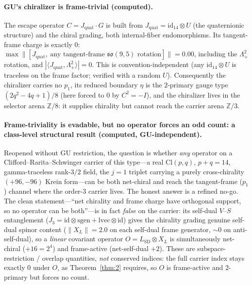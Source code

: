 \documentclass[11pt]{article}
\theoremstyle{definition}
\theoremstyle{remark}
\newcommand{\Z}{\mathbb{Z}}
\newcommand{\Cl}{\mathrm{Cl}}
\newcommand{\id}{\mathrm{id}}
\newcommand{\Lamp}{\Lambda^2_{+}}
\newcommand{\Jq}{J_{\mathrm{quat}}}
\begin{document}
\paragraph{GU's chiralizer is frame-trivial (computed).} The escape operator $C=\Jq\cdot G$ is built from
$\Jq = \id_{14}\otimes U$ (the quaternionic structure) and the chiral grading, both internal-fiber
endomorphisms. Its tangent-frame charge is exactly $0$:
$\max\|[\Jq,\ \text{any tangent-frame }\mathfrak{so}(9,5)\text{ rotation}]\| = 0.00$, including the $\Lamp$
rotation, and $|\langle \Jq,\Lamp\rangle| = 0$. This is convention-independent (any $\id_{14}\otimes U$ is
traceless on the frame factor; verified with a random $U$). Consequently the chiralizer carries no $p_1$, its
reduced boundary $\eta$ is the $2$-primary gauge type $(2q^2-4q+1)/8$ (here forced to $0$ by $C^2=-I$), and the
chiralizer lives in the selector arena $\Z/8$: it supplies chirality but cannot reach the carrier arena $\Z/3$.

\paragraph{Frame-triviality is evadable, but no operator forces an odd count: a class-level structural result
(computed, GU-independent).} Reopened without GU restriction, the question is whether \emph{any} operator on a
Clifford--Rarita--Schwinger carrier of this type---a real $\Cl(p,q)$, $p+q=14$, gamma-traceless rank-$3/2$ field,
the $j=1$ triplet carrying a purely cross-chirality $(+96,-96)$ Krein form---can be both net-chiral and reach the
tangent-frame ($p_1$) channel where the order-$3$ carrier lives. The honest answer is a refined no-go. The clean
statement---``net chirality and frame charge have orthogonal support, so no operator can be both''---is in fact
\emph{false} on the carrier: its self-dual $V$--$S$ entanglement ($J_3 = \id\otimes\mathrm{sgen} +
\mathrm{lvec}\otimes\id$) gives the chirality grading genuine self-dual spinor content ($\|X_L\| = 2.0$ on each
self-dual frame generator, $\sim 0$ on anti-self-dual), so a \emph{linear} covariant operator
$O = L_{\mathrm{SD}}\otimes X_L$ is simultaneously net-chiral ($+16 = 2^4$) and frame-active (net-self-dual $+2$).
These are subspace-restriction / overlap quantities, \emph{not} conserved indices: the full carrier index stays
exactly $0$ under $O$, as Theorem~\ref{thm:2} requires, so $O$ is frame-active and $2$-primary but forces no
count.
\end{document}
